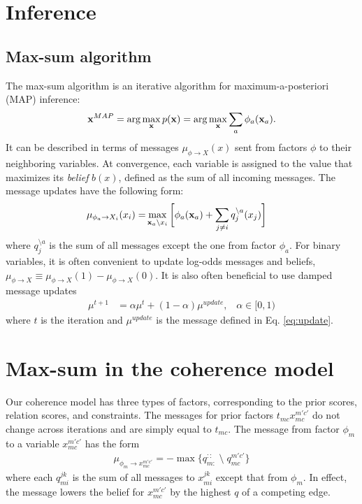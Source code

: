 \documentclass[11pt,letterpaper]{article}
\begin{document}
%


\section{Inference}

\subsection{Max-sum algorithm}
The max-sum algorithm is an iterative algorithm for maximum-a-posteriori (MAP) inference:
\begin{equation}
{\bf x}^{MAP} = \arg \max_{\bf x} p({\bf x}) = \arg \max_{\bf x} \sum_a \phi_a({\bf x}_a).
\end{equation}
 It can be described in terms of messages $\mu_{\phi \rightarrow X}(x)$ sent from factors $\phi$ to their neighboring variables. At convergence, each variable is assigned to the value that maximizes its \emph{belief} $b(x)$, defined as the sum of all incoming messages. The message updates have the following form:
\begin{align}
\mu_{\phi_a \rightarrow X_i}(x_i) =& \max_{ {\bf x}_a \setminus x_i } \bigg[ \phi_a({\bf x}_a) + \sum_{j \neq i} q_j^{\setminus a}(x_j)\bigg]
\label{eq:damping}
\end{align}
\noindent where $q_j^{\setminus a}$ is the sum of all messages except the one from factor $\phi_a$. For binary variables, it is often convenient to update log-odds messages and beliefs, $\mu_{\phi \rightarrow X} \equiv \mu_{\phi \rightarrow X}(1)-\mu_{\phi \rightarrow X}(0)$. It is also often beneficial to use damped message updates
\begin{align}
\mu^{t+1} &= \alpha \mu^t + (1 - \alpha) \mu^{update}, \;\;\; \alpha \in [0, 1)  
\end{align}
where $t$ is the iteration and $\mu^{update}$ is the message defined in Eq. \ref{eq:update}.

\section{Max-sum in the coherence model}

Our coherence model has three types of factors, corresponding to the prior scores, relation scores, and constraints. The messages for prior factors $t_{mc} x_{mc}^{m'c'}$ do not change across iterations and are simply equal to $t_{mc}$. The message from factor $\phi_m$ to a variable $x_{mc}^{m'c'}$ has the form
\begin{align}
\mu_{\phi_m \rightarrow x_{mc}^{m'c'}} = -\max \{ q_{m:}^{::} \; \setminus \; q_{mc}^{m'c'}\} 
\end{align}
where each $q_{mi}^{jk}$ is the sum of all messages to $x_{mi}^{jk}$ except that from $\phi_m$. In effect, the message lowers the belief for $x_{mc}^{m'c'}$ by the highest $q$ of a competing edge.
\end{document}
